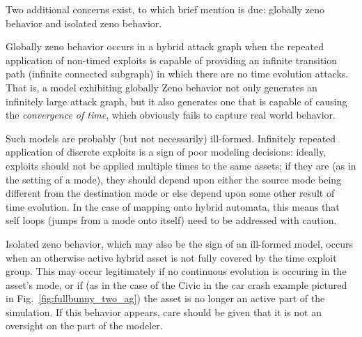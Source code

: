 Two additional concerns exist, to which brief mention is due: globally zeno 
behavior and isolated zeno behavior.

Globally zeno behavior occurs in a hybrid attack graph when the
repeated application of non-timed exploits is capable of providing an infinite
transition path (infinite connected subgraph) in which there are no time 
evolution attacks. That is, a model exhibiting globally Zeno behavior not only
generates an infinitely large attack graph, but it also generates one that is
capable of causing the \emph{convergence of time}, which obviously fails to
capture real world behavior.

Such models are probably (but
not necessarily) ill-formed. Infinitely repeated application of discrete
exploits is a sign of poor modeling decisions: ideally, exploits should not be
applied multiple times to the same assets; if they are (as in the setting of a
mode), they should depend upon either the source mode being different from the
destination mode or else depend upon some other result of time evolution. In the
case of mapping onto hybrid automata, this means that self loops (jumps from a
mode onto itself) need to be addressed with caution.

Isolated zeno behavior, which may also be the sign of an ill-formed model, 
occurs when an otherwise active hybrid asset is not fully covered by the time
exploit group. This may occur legitimately if no continuous evolution is
occuring in the asset's mode, or if (as in the case of the Civic in the
car crash example pictured in Fig.~\ref{fig:fullbunny_two_ag}) the asset is
no longer an active part of the simulation. If this behavior appears, care 
should be given that it is not an oversight on the part of the modeler.
